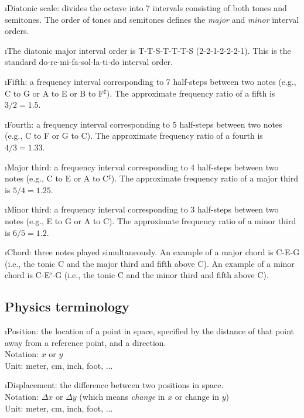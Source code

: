 \i Diatonic scale: divides the octave into 
7 intervals consisting of both tones and semitones.
The order of tones and semitones 
defines the {\em major} and 
{\em minor} interval orders.

\i The diatonic major interval order is 
T-T-S-T-T-T-S (2-2-1-2-2-2-1).
This is the standard
%
\be
{\rm do-re-mi-fa-sol-la-ti-do}
\nonumber
\ee
%
interval order.

\i Fifth: a frequency interval corresponding to 
7 half-steps between two notes 
(e.g., C to G or A to E or B to F$^\sharp$).
The approximate frequency ratio of a fifth is $3/2=1.5$. 

\i Fourth: a frequency interval corresponding to
5 half-steps between two notes
(e.g., C to F or G to C).
The approximate frequency ratio of a fourth is $4/3=1.33$.

\i Major third: a frequency interval corresponding to 
4 half-steps between two notes 
(e.g., C to E or A to C$^\sharp$).
The approximate frequency ratio of a major third is $5/4=1.25$. 

\i Minor third: a frequency interval corresponding to 
3 half-steps between two notes 
(e.g., E to G or A to C).
The approximate frequency ratio of a minor third is $6/5=1.2$. 

\i Chord: three notes played simultaneously.
An example of a major chord is C-E-G (i.e., the tonic C
and the major third and fifth above C).
An example of a minor chord is C-E$^\flat$-G (i.e., the tonic C
and the minor third and fifth above C).

\ei

\subsection{Physics terminology}

\bi

\i Position: 
the location of a point in space,
specified by the distance of that point away from a 
reference point, and a direction.
\\
Notation: $x$ or $y$
\\
Unit: meter, cm, inch, foot, ...

\i Displacement: 
the difference between two positions in space.
\\
Notation: $\Delta x$ or $\Delta y$ 
(which means {\em change} in $x$ or change in $y$)
\\
Unit: meter, cm, inch, foot, ...

